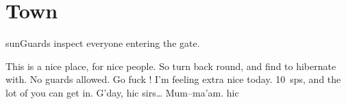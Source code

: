 \section*{Town}

\begin{multicols}{2}

{\sffamily \Glspl{sunGuard} inspect everyone entering the gate.}

\begin{exampletext}
\ifcase\value{temperature}
  This is a nice place, for nice people.
  So turn back round, and find  to hibernate with.
\or
  No \glspl{guard} allowed.
  Go fuck !
\or
  I'm feeling extra nice today.
  10~\glspl{sp}, and the lot of you can get in.
\else
  G'day, {\tiny hic} sirs\ldots
  Mum--ma'am.
  {\tiny hic}
\fi
{}
\end{exampletext}

\townArmoury

\townDocks

\townWeavers

\townHealers

\townTanner

\townGuardArms

\fightAdvert

\end{multicols}

\townGuardProjectiles

\bigLine

